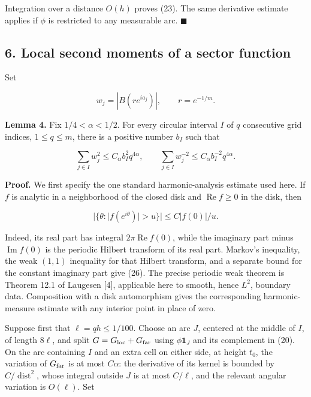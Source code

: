 \documentclass[10pt,a4paper]{article}
\begin{document}
Integration over a distance \(O(h)\) proves (23). The same derivative
estimate applies if \(\phi\) is restricted to any measurable arc. \ensuremath{\blacksquare}

\subsection{6. Local second moments of a sector
function}\label{local-second-moments-of-a-sector-function}

Set

\nopagebreak[4]
\[w_j=|B(re^{ia_j})|,\qquad r=e^{-1/m}.\]

\textbf{Lemma 4.} Fix \(1/4<\alpha<1/2\). For every circular interval
\(I\) of \(q\) consecutive grid indices, \(1\le q\le m\), there is a
positive number \(b_I\) such that

\nopagebreak[4]
\[\sum_{j\in I}w_j^2\le C_\alpha b_I^2q^{4\alpha},\qquad
 \sum_{j\in I}w_j^{-2}\le C_\alpha b_I^{-2}q^{4\alpha}. \tag{25}\]

\textbf{Proof.} We first specify the one standard harmonic-analysis
estimate used here. If \(f\) is analytic in a neighborhood of the closed
disk and \(\operatorname{Re}f\ge0\) in the disk, then

\nopagebreak[4]
\[|\{\theta:|f(e^{i\theta})|>u\}|
       \le C|f(0)|/u. \tag{26}\]

Indeed, its real part has integral \(2\pi\operatorname{Re}f(0)\), while
the imaginary part minus \(\operatorname{Im}f(0)\) is the periodic
Hilbert transform of its real part. Markov's inequality, the weak
\((1,1)\) inequality for that Hilbert transform, and a separate bound
for the constant imaginary part give (26). The precise periodic weak
theorem is Theorem 12.1 of Laugesen {[}4{]}, applicable here to smooth,
hence \(L^2\), boundary data. Composition with a disk automorphism gives
the corresponding harmonic-measure estimate with any interior point in
place of zero.

Suppose first that \(\ell=qh\le1/100\). Choose an arc \(J\), centered at
the middle of \(I\), of length \(8\ell\), and split
\(G=G_{\rm loc}+G_{\rm far}\) using \(\phi\mathbf1_J\) and its
complement in (20). On the arc containing \(I\) and an extra cell on
either side, at height \(t_0\), the variation of \(G_{\rm far}\) is at
most \(C\alpha\): the derivative of its kernel is bounded by
\(C/\operatorname{dist}^2\), whose integral outside \(J\) is at most
\(C/\ell\), and the relevant angular variation is \(O(\ell)\). Set
\end{document}

